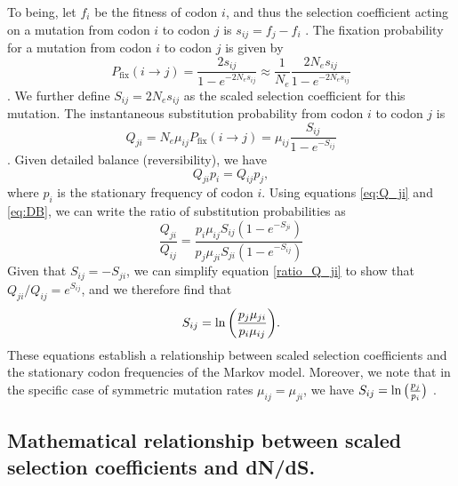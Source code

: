 \documentclass{pnastwo}
\begin{document}
\begin{article}
To being, let $f_i$ be the fitness of codon $i$, and thus the selection coefficient acting on a mutation from codon $i$ to codon $j$ is $s_{ij} = f_j - f_i$ \cite{SellaHirsh2005,YangNielsen2008}. The fixation probability for a mutation from codon $i$ to codon $j$ is given by 
\begin{equation}\label{eq:pfix}
P_\text{fix}(i \rightarrow j) = \frac{2s_{ij}}{1 - e^{-2N_es_{ij}}} \approx \frac{1}{N_e}\frac{2N_es_{ij}}{1 - e^{-2N_es_{ij}}} 
\end{equation} \cite{Kimura1962,HalpernBruno1998,YangNielsen2008}. We further define $S_{ij} = 2N_es_{ij}$ as the scaled selection coefficient for this mutation. The instantaneous substitution probability from codon $i$ to codon $j$ is  
\begin{equation}\label{eq:Q_ji}
Q_{ji} = N_e\mu_{ij}P_\text{fix}(i \rightarrow j) = \mu_{ij}\frac{S_{ij}}{1 - e^{-S_{ij}}}
\end{equation} 
\cite{HalpernBruno1998,SellaHirsh2005}. Given detailed balance (reversibility), we have 
\begin{equation}\label{eq:DB}
Q_{ji}p_i = Q_{ij}p_j,
\end{equation} 
where $p_i$ is the stationary frequency of codon $i$. Using equations \eqref{eq:Q_ji} and \eqref{eq:DB}, we can write the ratio of substitution probabilities as 
\begin{equation}\label{ratio_Q_ji}
\frac{Q_{ji}}{Q_{ij}} = \frac{p_i \mu_{ij} S_{ij} (1-e^{-S_{ji}})}{p_j \mu_{ji} S_{ji} (1-e^{-S_{ij}})} 
\end{equation}
Given that $S_{ij} = -S_{ji}$, we can simplify equation \eqref{ratio_Q_ji} to show that $Q_{ji}/Q_{ij} = e^{S_{ij}}$, and we therefore find that
\begin{equation}\label{s_pmu}
S_{ij} = \ln\bigg{(}     \frac{p_j\mu_{ji}}{p_i\mu_{ij}}\bigg{)}. 
\end{equation}
These equations establish a relationship between scaled selection coefficients and the stationary codon frequencies of the Markov model. Moreover, we note that in the specific case of symmetric mutation rates $\mu_{ij} = \mu_{ji}$, we have $S_{ij} = \ln\big{(}{\frac{p_j} {p_i}}\big{)}$ \cite{SellaHirsh2005}. 


		
\subsection*{Mathematical relationship between scaled selection coefficients and dN/dS.} 


\end{article}
\end{document}
